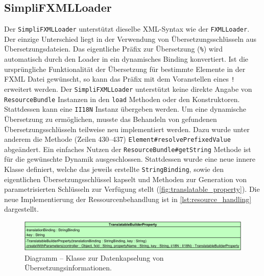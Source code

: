 \subsection{SimpliFXMLLoader}
\label{simplifxmlloader}
Der \texttt{SimpliFXMLLoader} unterstützt dieselbe XML-Syntax wie der \texttt{FXMLLoader}. Der einzige Unterschied liegt in der Verwendung von Übersetzungsschlüsseln aus Übersetzungsdateien. Das eigentliche Präfix zur Übersetzung (\glqq\texttt{\%}\grqq) wird automatisch durch den Loader in ein dynamisches Binding konvertiert. Ist die ursprüngliche Funktionalität der Übersetzung für bestimmte Elemente in der FXML Datei gewünscht, so kann das Präfix mit dem Voranstellen eines \glqq\texttt{!}\grqq{} erweitert werden. Der \texttt{SimpliFXMLLoader} unterstützt keine direkte Angabe von \texttt{ResourceBundle} Instanzen in den \texttt{load} Methoden oder den Konstruktoren. Stattdessen kann eine \texttt{II18N} Instanz übergeben werden. Um eine dynamische Übersetzung zu ermöglichen, musste das Behandeln von gefundenen Übersetzungsschlüsseln teilweise neu implementiert werden. Dazu wurde unter anderem die Methode (Zeilen 430--437) \texttt{Element\#resolvePrefixedValue} abgeändert. Ein einfaches Nutzen der \texttt{ResourceBundle\#getString} Methode ist für die gewünschte Dynamik ausgeschlossen. Stattdessen wurde eine neue innere Klasse definiert, welche das jeweils erstellte \texttt{StringBinding}, sowie den eigentlichen Übersetzungsschlüssel kapselt und Methoden zur Generation von parametrisierten Schlüsseln zur Verfügung stellt (\autoref{fig:translatable_property}). Die neue Implementierung der Ressourcenbehandlung ist in \autoref{lst:resource_handling} dargestellt.
\begin{figure}[H]
	\centering
	\includegraphics[width=\textwidth]{Abbildungen/Ressourcenbehandlung.png}
	\caption{Diagramm -- Klasse zur Datenkapselung von Übersetzungsinformationen.}
	\label{fig:translatable_property}
\end{figure}
